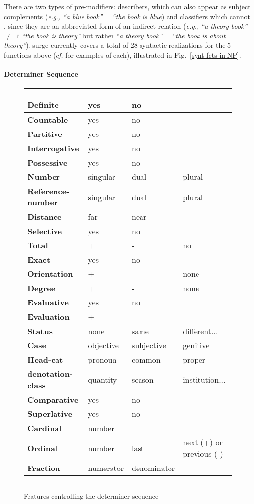 There are two types of pre-modifiers: describers, which can also appear
as subject complements ({\em e.g., ``a blue book''} = {\em ``the book is
  blue}) and classifiers which cannot \cite{winograd}, since they are an
abbreviated form of an indirect relation \cite{levi} ({\em e.g., ``a theory
  book''} $\neq$ {\em ? ``the book is theory''} but rather {\em ``a theory
  book''} = {\em ``the book is \underline{about} theory''}). {\sc surge}
currently covers a total of 28 syntactic realizations for the 5 functions
above ({\em cf.} \cite{robin-phd} for examples of each), illustrated in 
Fig.~\ref{synt-fcts-in-NP}.


\paragraph{Determiner Sequence}

\begin{figure*} [t]
\rule[.3cm]{\textwidth}{.01in}
\small
\begin{tabular}{|l|l|l|l|}\hline
{\bf Definite} & yes & no & \\ \hline
{\bf Countable} & yes & no & \\ \hline
{\bf Partitive} & yes & no & \\ \hline
{\bf Interrogative} & yes & no &\\ \hline
{\bf Possessive} & yes & no & \\ \hline
{\bf Number} & singular & dual & plural\\ \hline 
{\bf Reference-number} & singular & dual & plural\\ \hline
{\bf Distance} & far & near & \\ \hline
{\bf Selective} & yes & no & \\ \hline
{\bf Total} & + & - & no\\ \hline
{\bf Exact} & yes & no & \\ \hline
{\bf Orientation} & + & - & none\\ \hline
{\bf Degree} & + & - & none\\ \hline
{\bf Evaluative} & yes & no & \\ \hline
{\bf Evaluation} & + & - & \\ \hline
{\bf Status} & none & same & different...\\ \hline
{\bf Case} & objective & subjective & genitive\\ \hline
{\bf Head-cat} & pronoun & common & proper\\ \hline
{\bf denotation-class} & quantity & season & institution...\\ \hline
{\bf Comparative} & yes & no & \\ \hline
{\bf Superlative} & yes & no & \\ \hline
{\bf Cardinal} & number & & \\ \hline
{\bf Ordinal} & number & last & next (+) or previous (-)\\ \hline
{\bf Fraction} & numerator & denominator & \\ \hline
\end{tabular}
\caption{Features controlling the determiner sequence}
\label{detseq}
\rule{\textwidth}{.01in}
\end{figure*}

